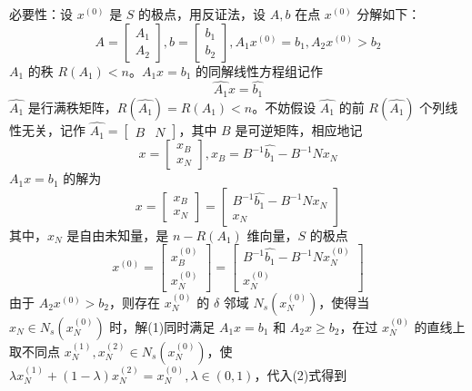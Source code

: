 \begin{solution}
    必要性：设 $x^{(0)}$ 是 $S$ 的极点，用反证法，设 $A, b$ 在点 $x^{(0)}$ 分解如下：
    \[A = \begin{bmatrix}
        A_1 \\ 
        A_2
    \end{bmatrix}, b = \begin{bmatrix}
        b_1 \\ 
        b_2
    \end{bmatrix}, A_1x^{(0)} = b_1, A_2x^{(0)} > b_2\]
    $A_1$ 的秩 $R(A_1) < n$。$A_1x = b_1$ 的同解线性方程组记作 \[\hat{A_1}x = \hat{b_1}\]
    $\hat{A_1}$ 是行满秩矩阵，$R(\hat{A_1}) = R(A_1) < n$。不妨假设 $\hat{A_1}$ 的前 $R(\hat{A_1})$ 个列线性无关，记作 $\hat{A_1} = \begin{bmatrix}
        B & N
    \end{bmatrix}$，其中 $B$ 是可逆矩阵，相应地记 \[x = \begin{bmatrix}
        x_B \\
        x_N
    \end{bmatrix},x_B = B^{-1}\hat{b_1} - B^{-1}Nx_N\]
    $A_1x = b_1$ 的解为 
    \begin{equation}
        x = \begin{bmatrix}
            x_B\\
            x_N
        \end{bmatrix} = \begin{bmatrix}
            B^{-1}\hat{b_1} - B^{-1}Nx_N \\
            x_N
        \end{bmatrix}
    \end{equation}
    其中，$x_N$ 是自由未知量，是 $n - R(A_1)$ 维向量，$S$ 的极点
    \begin{equation}
        x^{(0)} = \begin{bmatrix}
            x_B^{(0)}\\
            x_N^{(0)}
        \end{bmatrix} = \begin{bmatrix}
            B^{-1}\hat{b_1} - B^{-1}Nx_N^{(0)} \\
            x_N^{(0)}
        \end{bmatrix}
    \end{equation}
    由于 $A_2x^{(0)} > b_2$，则存在 $x_N^{(0)}$ 的 $\delta$ 邻域 $N_s(x_N^{(0)})$，使得当 $x_N\in N_s(x_N^{(0)})$ 时，解(1)同时满足 $A_1x = b_1$ 和 $A_2x \ge b_2$，在过 $x_N^{(0)}$ 的直线上取不同点 $x_N^{(1)}, x_N^{(2)} \in N_s(x_N^{(0)})$，使 $\lambda x_N^{(1)} + (1 - \lambda)x_N^{(2)} = x_N^{(0)}, \lambda \in (0, 1)$，代入(2)式得到

\end{solution}
